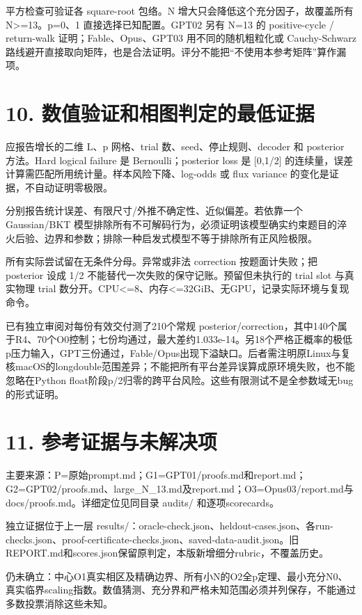 \documentclass[11pt,a4paper]{article}
\begin{document}
平方检查可验证各 square-root 包络。N 增大只会降低这个充分因子，故覆盖所有 N>=13。p=0、1 直接选择已知配置。GPT02 另有 N=13 的 positive-cycle / return-walk 证明；Fable、Opus、GPT03 用不同的随机粗粒化或 Cauchy-Schwarz 路线避开直接取向矩阵，也是合法证明。评分不能把“不使用本参考矩阵”算作漏项。

\section*{10. 数值验证和相图判定的最低证据}

应报告增长的二维 L、p 网格、trial 数、seed、停止规则、decoder 和 posterior 方法。Hard logical failure 是 Bernoulli；posterior loss 是 [0,1/2] 的连续量，误差计算需匹配所用统计量。样本风险下降、log-odds 或 flux variance 的变化是证据，不自动证明零极限。

分别报告统计误差、有限尺寸/外推不确定性、近似偏差。若依靠一个 Gaussian/BKT 模型排除所有不可解码行为，必须证明该模型确实约束题目的淬火后验、边界和参数；排除一种启发式模型不等于排除所有正风险极限。

所有实际尝试留在无条件分母。异常或非法 correction 按题面计失败；把 posterior 设成 1/2 不能替代一次失败的保守记账。预留但未执行的 trial slot 与真实物理 trial 数分开。CPU<=8、内存<=32GiB、无GPU，记录实际环境与复现命令。

已有独立审阅对每份有效交付测了210个常规 posterior/correction，其中140个属于R4、70个O0控制；七份均通过，最大差约1.033e-14。另18个严格正概率的极低p压力输入，GPT三份通过，Fable/Opus出现下溢缺口。后者需注明原Linux与复核macOS的longdouble范围差异；不能把所有平台差异误算成原环境失败，也不能忽略在Python float阶段p/2归零的跨平台风险。这些有限测试不是全参数域无bug的形式证明。

\section*{11. 参考证据与未解决项}

主要来源：P=原始prompt.md；G1=GPT01/proofs.md和report.md；G2=GPT02/proofs.md、large\_N\_13.md及report.md；O3=Opus03/report.md与docs/proofs.md。详细定位见同目录 audits/ 和逐项scorecards。

独立证据位于上一层 results/：oracle-check.json、heldout-cases.json、各run-checks.json、proof-certificate-checks.json、saved-data-audit.json。旧REPORT.md和scores.json保留原判定，本版新增细分rubric，不覆盖历史。

仍未确立：中心O1真实相区及精确边界、所有小N的O2全p定理、最小充分N0、真实临界scaling指数。数值猜测、充分界和严格未知范围必须并列保存，不能通过多数投票消除这些未知。
\end{document}
